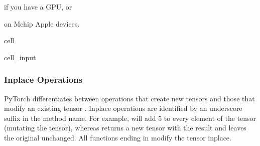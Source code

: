 \documentclass[letterpaper,10pt,english]{jupyterBook}
\begin{document}
\begin{sphinxVerbatim}[commandchars=\\\{\}]
   
   
\end{sphinxVerbatim}

\sphinxAtStartPar
if you have a GPU, or

\begin{sphinxVerbatim}[commandchars=\\\{\}]
   
   
\end{sphinxVerbatim}

\sphinxAtStartPar
on M\sphinxhyphen{}chip Apple devices.

\begin{sphinxuseclass}{cell}\begin{sphinxVerbatimInput}

\begin{sphinxuseclass}{cell_input}
\begin{sphinxVerbatim}[commandchars=\\\{\}]
\end{sphinxVerbatim}

\end{sphinxuseclass}\end{sphinxVerbatimInput}

\end{sphinxuseclass}

\subsubsection{In\sphinxhyphen{}place Operations}
\label{\detokenize{04:in-place-operations}}
\sphinxAtStartPar
PyTorch differentiates between operations that create new tensors and those that modify an existing tensor . In\sphinxhyphen{}place operations are identified by an underscore suffix in the method name. For example,  will add 5 to every element of the tensor  (mutating the tensor), whereas  returns a new tensor with the result and leaves the original unchanged. All functions ending in \sphinxcode{\sphinxupquote{\_}} modify the tensor in\sphinxhyphen{}place.
\end{document}

